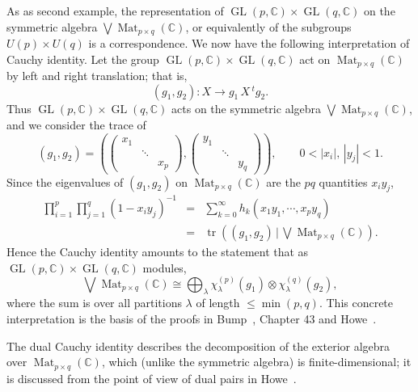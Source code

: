 \documentclass[11pt]{amsart}
\newcommand{\tmop}[1]{\ensuremath{\operatorname{#1}}}
\begin{document}
As as second example, the representation of $\tmop{GL} (
p,\mathbb{C}) \times \tmop{GL} ( q,\mathbb{C})$ on the symmetric
algebra $\bigvee \tmop{Mat}_{p \times q} (\mathbb{C})$, or
equivalently of the subgroups $U ( p ) \times U ( q )$ is a
correspondence. We now have the following interpretation of Cauchy
identity.   Let the group $\tmop{GL} ( p,\mathbb{C}) \times
\tmop{GL} ( q,\mathbb{C})$ act on $\tmop{Mat}_{p \times q}
(\mathbb{C})$ by left and right translation; that is,
\[ ( g_1, g_2 ) : X \longrightarrow g_1 \, X \, {^t g_2} . \]
Thus $\tmop{GL} ( p,\mathbb{C}) \times \tmop{GL} ( q,\mathbb{C})$
acts on the symmetric algebra $\bigvee \tmop{Mat}_{p \times q}
(\mathbb{C})$, and we consider the trace of
\[ ( g_1, g_2 ) = \left( \left(\begin{array}{ccc}
    x_1 &  & \\
    & \ddots & \\
    &  & x_p
  \end{array}\right), \left(\begin{array}{ccc}
    y_1 &  & \\
    & \ddots & \\
    &  & y_q
  \end{array}\right) \right), \hspace{2em} 0 < |x_i |, \, |y_j | < 1. \]
Since the eigenvalues of $( g_1, g_2 )$ on $\tmop{Mat}_{p \times
q} (\mathbb{C})$ are the $p q$ quantities $x_i y_j$,
\begin{eqnarray*}
\prod_{i = 1}^p \prod_{j = 1}^q ( 1 - x_i y_j )^{- 1} & = &
\sum_{k =
0}^{\infty} h_k ( x_1 y_1, \cdots, x_p y_q )\\
& = & \tmop{tr} \left( ( g_1, g_2 ) \, | \, \bigvee \tmop{Mat}_{p
\times q} (\mathbb{C}) \right) .
\end{eqnarray*}
Hence the Cauchy identity amounts to the statement that as
$\tmop{GL} ( p,\mathbb{C}) \times \tmop{GL} ( q,\mathbb{C})$
modules,
\begin{equation}
\label{ratioscauchyconcrete} \bigvee \tmop{Mat}_{p \times q}
(\mathbb{C}) \cong \bigoplus_{\lambda} \chi_{\lambda}^{( p )} (
g_1 ) \otimes \chi_{\lambda}^{( q )} ( g_2 ),
\end{equation}
where the sum is over all partitions $\lambda$ of length
$\leqslant \min ( p, q )$. This concrete interpretation is the
basis of the proofs in Bump~{\cite{DB}}, Chapter 43 and
Howe~{\cite{HowePerspectives}}.

The dual Cauchy identity describes the decomposition of the
exterior algebra over $\tmop{Mat}_{p \times q} (\mathbb{C})$,
which (unlike the symmetric algebra) is finite-dimensional; it is
discussed from the point of view of dual pairs in
Howe~{\cite{HowePerspectives}}.
\end{document}
